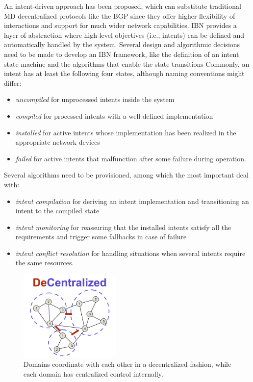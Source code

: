 \documentclass{juliacon}
\begin{document}
    An intent-driven approach \cite{2023ietf, 2022ChristouCNSM} has been proposed, which can substitute traditional \ac{MD} decentralized protocols like the \ac{BGP} since they offer higher flexibility of interactions and support for much wider network capabilities.
    \ac{IBN} provides a layer of abstraction where high-level objectives (i.e., intents) can be defined and automatically handled by the system.
    Several design and algorithmic decisions need to be made to develop an \ac{IBN} framework, like the definition of an intent state machine and the algorithms that enable the state transitions
    Commonly, an intent has at least the following four states, although naming conventions might differ:
    \begin{itemize}
        \item \emph{uncompiled} for unprocessed intents inside the system
        \item \emph{compiled} for processed intents with a well-defined implementation
        \item \emph{installed} for active intents whose implementation has been realized in the appropriate network devices
        \item \emph{failed} for active intents that malfunction after some failure during operation.
    \end{itemize}
    Several algorithms need to be provisioned, among which the most important deal with:
    \begin{itemize}
        \item \emph{intent compilation} for deriving an intent implementation and transitioning an intent to the compiled state
        \item \emph{intent monitoring} for reassuring that the installed intents satisfy all the requirements and trigger some fallbacks in case of failure
        \item \emph{intent conflict resolution} for handling situations when several intents require the same resources.
    \end{itemize}


    \begin{figure}[t]
    \centerline{\includegraphics[width=5cm]{Motive.pdf}}
    \caption{Domains coordinate with each other in a decentralized fashion, while each domain has centralized control internally.}
        \label{fig:DeCentralized}
    \end{figure}
\end{document}
